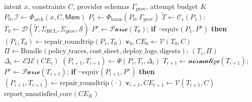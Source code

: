 \documentclass[manuscript,screen,nonacm]{acmart}
\begin{document}



\begin{algorithm}[t]
\caption{MACOG Orchestration with Counterexample-Guided Repair (No Fine-Tuning)}
\label{alg:macog}
\begin{algorithmic}[1]
\Require intent $x$, constraints $C$, provider schemas $\Gamma_{\text{prov}}$, attempt budget $K$
\State $P_0, \mathcal{I} \gets \Phi_{\text{arch}}(x, C, \mathsf{Mem})$ 
\State $P_1 \gets \Phi_{\text{harm}}(P_0, \Gamma_{\text{prov}})$ 
\State $\widetilde{T} \gets \mathcal{C}_s(P_1)$; $T_0 \gets \mathcal{D}(\widetilde{T}, \Sigma_{\text{HCL}}, \Sigma_{\text{prov}}, \mathcal{S})$ 
\State $P^\star \gets \mathcal{P\!arse}(T_0)$; \textbf{if} $\neg\mathrm{equiv}(P_1,P^\star)$ \textbf{then} $(P_1,T_0)\gets \mathrm{repair\_roundtrip}(P_1,T_0)$
\State $\mathbf{v}_0, CE_0 \gets \mathcal{V}(T_0, C)$ 
     \State $\Pi \gets \mathrm{Bundle}(\text{policy\_traces},\text{cost\_sheet},\text{deploy\_logs},\text{digests})$; \Return $(T_i,\Pi)$
  \EndIf
  \State $\Delta_i \gets \mathcal{E2E}(CE_i)$ 
  \State $(P_{i+1}, T_{i+1}) \gets \Psi(P_i, T_i, \Delta_i)$ 
  \State $T_{i+1} \gets \mathcal{normalize}(T_{i+1})$; $P^\diamond \gets \mathcal{P\!arse}(T_{i+1})$; \textbf{if} $\neg\mathrm{equiv}(P_{i+1},P^\diamond)$ \textbf{then} $(P_{i+1},T_{i+1})\gets \mathrm{repair\_roundtrip}(\cdot)$
  \State $\mathbf{v}_{i+1}, CE_{i+1} \gets \mathcal{V}(T_{i+1}, C)$
\EndFor
\State \Return $\mathrm{report\_unsatisfied\_core}(CE_{K})$
\end{algorithmic}
\end{algorithm}
\end{document}
